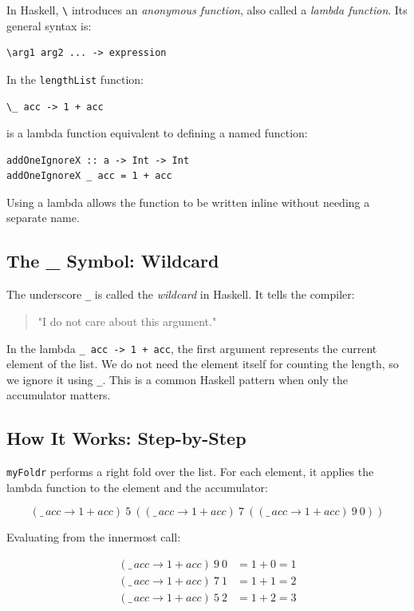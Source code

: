 \documentclass[12pt]{article}
\begin{document}
In Haskell, \texttt{\textbackslash} introduces an \emph{anonymous function}, also called a \emph{lambda function}. Its general syntax is:

\begin{verbatim}
\arg1 arg2 ... -> expression
\end{verbatim}

In the \texttt{lengthList} function:

\begin{verbatim}
\_ acc -> 1 + acc
\end{verbatim}

is a lambda function equivalent to defining a named function:

\begin{verbatim}
addOneIgnoreX :: a -> Int -> Int
addOneIgnoreX _ acc = 1 + acc
\end{verbatim}

Using a lambda allows the function to be written inline without needing a separate name.

\subsection{The \_ Symbol: Wildcard}

The underscore \texttt{\_} is called the \emph{wildcard} in Haskell. It tells the compiler:

\begin{quote}
    "I do not care about this argument."
\end{quote}

In the lambda \texttt{\_ acc -> 1 + acc}, the first argument represents the current element of the list. We do not need the element itself for counting the length, so we ignore it using \texttt{\_}. This is a common Haskell pattern when only the accumulator matters.

\subsection{How It Works: Step-by-Step}

\texttt{myFoldr} performs a right fold over the list. For each element, it applies the lambda function to the element and the accumulator:

\[
    (\_\, acc \to 1 + acc)\ 5 \ ((\_\, acc \to 1 + acc)\ 7 \ ((\_\, acc \to 1 + acc)\ 9\ 0))
\]

Evaluating from the innermost call:

\begin{align*}
    (\_\, acc \to 1 + acc)\ 9\ 0 & = 1 + 0 = 1 \\
    (\_\, acc \to 1 + acc)\ 7\ 1 & = 1 + 1 = 2 \\
    (\_\, acc \to 1 + acc)\ 5\ 2 & = 1 + 2 = 3
\end{align*}
\end{document}
